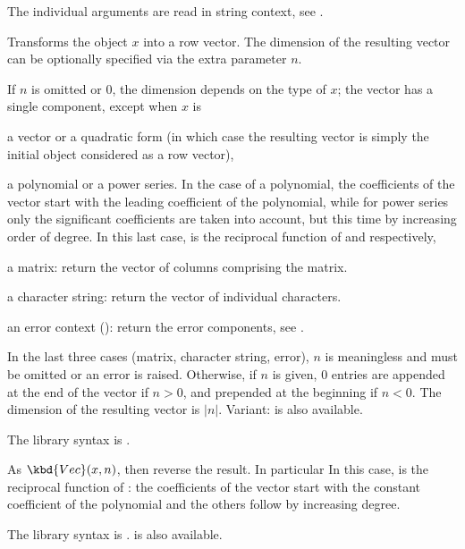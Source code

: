 The individual arguments are read in string context, see .

\label{se:Vec}
Transforms the object $x$ into a row vector. The dimension of the
resulting vector can be optionally specified via the extra parameter $n$.

If $n$ is omitted or $0$, the dimension depends on the type of $x$; the
vector has a single component, except when $x$ is

\item a vector or a quadratic form (in which case the resulting vector
is simply the initial object considered as a row vector),

\item a polynomial or a power series. In the case of a polynomial, the
coefficients of the vector start with the leading coefficient of the
polynomial, while for power series only the significant coefficients are
taken into account, but this time by increasing order of degree.
In this last case,  is the reciprocal function of  and
 respectively,

\item a matrix: return the vector of columns comprising the matrix.

\item a character string: return the vector of individual characters.

\item an error context (): return the error components, see
.

In the last three cases (matrix, character string, error), $n$ is
meaningless and must be omitted or an error is raised. Otherwise, if $n$ is
given, $0$ entries are appended at the end of the vector if $n > 0$, and
prepended at the beginning if $n < 0$. The dimension of the resulting vector
is $|n|$. Variant:  is also available.

The library syntax is .

\label{se:Vecrev}
As $\kbd{Vec}(x, n)$, then reverse the result. In particular
In this case,  is the reciprocal function of : the
coefficients of the vector start with the constant coefficient of the
polynomial and the others follow by increasing degree.

The library syntax is .
 is also available.

